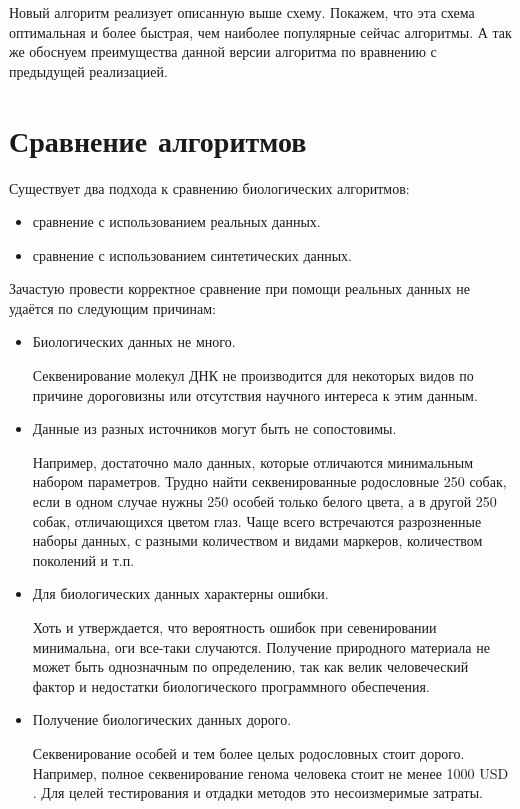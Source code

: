 \documentclass{matmex-diploma-custom}
\begin{document}
Новый алгоритм реализует описанную выше схему. Покажем, что эта схема
оптимальная и более быстрая, чем наиболее популярные сейчас
алгоритмы. А так же обоснуем преимущества данной версии алгоритма по
вравнению с предыдущей реализацией.

\section{Сравнение алгоритмов}

Существует два подхода к сравнению биологических алгоритмов:
\begin{itemize}
\item сравнение с использованием реальных данных.
\item сравнение с использованием синтетических данных.
\end{itemize}

Зачастую провести корректное сравнение при помощи реальных данных не
удаётся по следующим причинам:

\begin{itemize}
\item Биологических данных не много.

  Секвенирование молекул ДНК не производится для некоторых видов по
  причине дороговизны или отсутствия научного интереса к этим данным.

\item Данные из разных источников могут быть не сопостовимы.

  Например, достаточно мало данных, которые отличаются минимальным
  набором параметров. Трудно найти секвенированные родословные 250
  собак, если в одном случае нужны 250 особей только белого цвета, а в
  другой 250 собак, отличающихся цветом глаз. Чаще всего встречаются
  разрозненные наборы данных, с разными количеством и видами маркеров,
  количеством поколений и т.п.

\item Для биологических данных характерны ошибки.

  Хоть и утверждается, что вероятность ошибок при севенировании
  минимальна, оги все-таки случаются. Получение природного материала
  не может быть однозначным по определению, так как велик человеческий
  фактор и недостатки биологического программного обеспечения.

\item Получение биологических данных дорого.

  Секвенирование особей и тем более целых родословных стоит
  дорого. Например, полное секвенирование генома человека стоит не
  менее 1000 USD \cite{kircher2010high}. Для целей тестирования и
  отдадки методов это несоизмеримые затраты.

\end{itemize}
\end{document}
